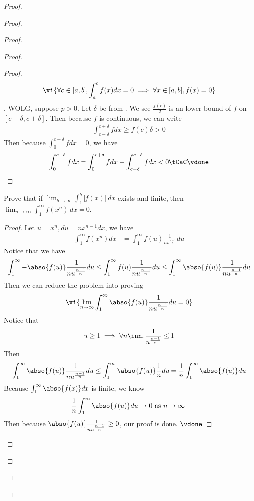 \documentclass{report}
\begin{document}
\begin{proof}
\begin{proof}
\begin{proof}
\begin{proof}
\begin{proof}
\begin{align*}
\vi{\forall c\in [a,b],\int_a^c f(x)dx=0 \implies \forall x\in [a,b], f(x)=0}
\end{align*}
. WOLG, suppose  $p>0$. Let $\delta$ be from  . We see $\frac{f(c)}{2}$ is an lower bound of $f$ on  $[c-\delta,c+\delta]$. Then because $f$ is continuous, we can write 
\begin{align*}
\int_{c-\delta}^{c+\delta} fdx\geq f(c)\delta >0
\end{align*}
Then because $\int_0^{c+\delta}fdx=0$, we have 
\begin{align*}
\int_0^{c-\delta}fdx= \int_0^{c+\delta}fdx-\int_{c-\delta}^{c+\delta}fdx<0\tCaC \vdone
\end{align*}
\end{proof}
\begin{question}{}{}

Prove that if \(\lim_{b \to \infty} \int_{1}^{b} |f(x)| \, dx\) exists and finite, then \(\lim_{n \to \infty} \int_{1}^{\infty} f(x^n) \, dx = 0\).
\end{question}
\begin{proof}
Let $u=x^n,du=nx^{n-1}dx$, we have 
 \begin{align*}
\int_1^\infty f(x^n)dx&=\int_1^\infty  f(u)\frac{1}{nu^{\frac{n-1}{n}}}du 
\end{align*}
Notice that we have 
\begin{align*}
\int_1^\infty - \abso{f(u)} \frac{1}{n u^{\frac{n-1}{n}}}du \leq \int_1^\infty f(u) \frac{1}{nu^{\frac{n-1}{n}}}du \leq  \int_1^\infty \abso{f(u)} \frac{1}{n u^{\frac{n-1}{n}}}du
\end{align*}
Then we can reduce the problem into proving 
\begin{align*}
  \vi{\lim_{n \to \infty} \int_1^\infty \abso{f(u)} \frac{1}{n u^{\frac{n-1}{n}}}du=0}
\end{align*}
Notice that 
\begin{align*}
u\geq 1 \implies  \forall n\inn,  \frac{1}{u^{\frac{n-1}{n}}}\leq 1
\end{align*}
Then 
\begin{align*}
\int_1^\infty \abso{f(u)} \frac{1}{n u^{\frac{n-1}{n}}}du\leq  \int_1^\infty \abso{f(u)} \frac{1}{n}du=\frac{1}{n} \int_1^\infty \abso{f(u)}du 
\end{align*}
Because $\int_1^\infty \abso{f(x)}dx$ is finite, we know 
\begin{align*}
\frac{1}{n}\int_1^\infty \abso{f(u)}du\to 0 \text{ as $n \to \infty$ }
\end{align*}
Then because $\abso{f(u)}\frac{1}{nu^{\frac{n-1}{n}}}\geq 0$,  our proof is done. $\vdone$
\end{proof}
\begin{question}{}{}


\end{question}
\end{proof}
\end{proof}
\end{proof}
\end{proof}
\end{document}
